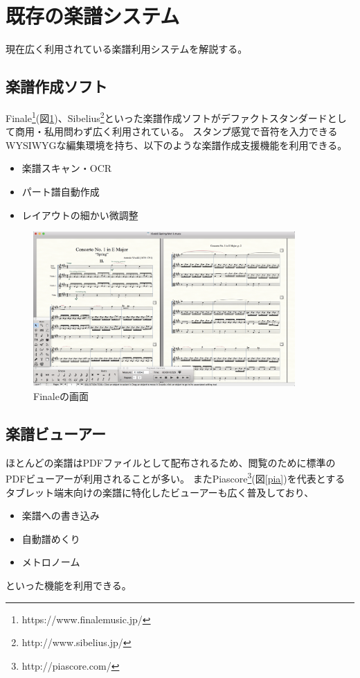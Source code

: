 \section{既存の楽譜システム}
現在広く利用されている楽譜利用システムを解説する。
\subsection{楽譜作成ソフト}
Finale\footnote{\textsf{https://www.finalemusic.jp/}}(図\ref{finale})、Sibelius\footnote{\textsf{http://www.sibelius.jp/}}といった楽譜作成ソフトがデファクトスタンダードとして商用・私用問わず広く利用されている。
スタンプ感覚で音符を入力できるWYSIWYGな編集環境を持ち、以下のような楽譜作成支援機能を利用できる。
\begin{itemize}
    \item 楽譜スキャン・OCR
    \item パート譜自動作成
    \item レイアウトの細かい微調整
\end{itemize}

\begin{figure}[H]
    \centering
    \includegraphics[width=10cm]{images/finale.png}
    \caption{Finaleの画面}
    \label{finale}
\end{figure}

\subsection{楽譜ビューアー}
ほとんどの楽譜はPDFファイルとして配布されるため、閲覧のために標準のPDFビューアーが利用されることが多い。
またPiascore\footnote{\textsf{http://piascore.com/}}(図\ref{pia})を代表とするタブレット端末向けの楽譜に特化したビューアーも広く普及しており、
\begin{itemize}
    \item 楽譜への書き込み
    \item 自動譜めくり
    \item メトロノーム
\end{itemize}といった機能を利用できる。

